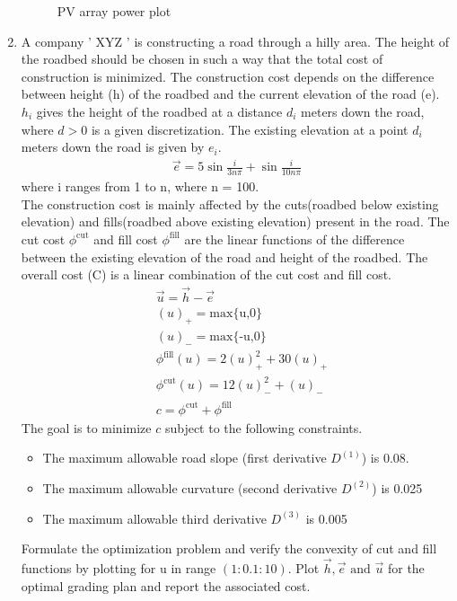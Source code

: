 \documentclass[journal,12pt,twocolumn]{IEEEtran}
\begin{document}
\begin{enumerate}
\begin{figure}[H]
    \caption{PV array power plot}
    \label{}
\end{figure}
\item A company ’ XYZ ’ is constructing a road through a hilly area. The height
of the roadbed should be chosen in such a way that the total cost of construction
is minimized. The construction cost depends on the difference between height (h)
of the roadbed and the current elevation of the road (e). $h_i$ gives the height of
the roadbed at a distance $d_i$ meters down the road, where $d > 0$ is a given
discretization. The existing elevation at a point $d_i$ meters down the road is
given by $e_i$. 
\begin{align}
\vec{e} = 5\sin\displaystyle\frac{i}{3n\pi}+\sin\displaystyle\frac{i}{10n\pi} \nonumber
\end{align}
where i ranges from 1 to n, where n = 100.\\
The construction cost is mainly affected by the cuts(roadbed below existing
elevation) and fills(roadbed above existing elevation) present in the road. The
cut cost $\phi^\text{cut}$ and fill cost $\phi^\text{fill}$ are the linear functions of the difference between
the existing elevation of the road and height of the roadbed. The overall cost
(C) is a linear combination of the cut cost and fill cost. 
\begin{align}
& \vec{u} = \vec{h} -\vec{e} \nonumber\\
& (u)_+ = \text{max\{u,0\}} \nonumber\\
& (u)_- = \text{max\{-u,0\}} \nonumber\\
& \phi^\text{fill}(u) = 2(u)_+^2 + 30(u)_+ \nonumber\\
& \phi^\text{cut}(u) = 12(u)_-^2 + (u)_- \nonumber\\
&c= \phi^\text{cut}+\phi^\text{fill} \nonumber
\end{align}
The goal is to minimize $c$ subject to the following constraints.
\begin{itemize}
\item The maximum allowable road slope (first derivative $D^{(1)}$) is 0.08.
\item The maximum allowable curvature (second derivative $D^{(2)}$) is 0.025
\item The maximum allowable third derivative $D^{(3)}$ is 0.005
\end{itemize}
Formulate the optimization problem and verify the convexity of cut and fill functions by plotting for u in range $(1:0.1:10)$.  Plot $\vec{h}, \vec{e} \text{ and } \vec{u}$ for the optimal grading plan and report the associated cost.\\

\end{enumerate}
\end{document}
